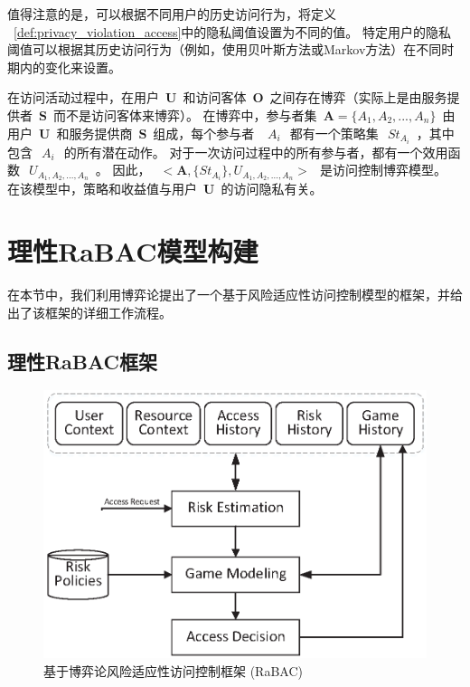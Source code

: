 值得注意的是，可以根据不同用户的历史访问行为，将定义 ~\ref{def:privacy_violation_access}中的隐私阈值设置为不同的值。 特定用户的隐私阈值可以根据其历史访问行为（例如，使用贝叶斯方法或Markov方法）在不同时期内的变化来设置。

在访问活动过程中，在用户~$\mathbf{U}$~和访问客体~$\mathbf{O}$~之间存在博弈（实际上是由服务提供者~$\mathbf{S}$~而不是访问客体来博弈）。 在博弈中，参与者集~$\mathbf{A}=\{A_1,A_2,...,A_n\}$~由用户~$\mathbf{U}$~和服务提供商~$\mathbf{S}$~组成，每个参与者 ~$~A_i~$~都有一个策略集~$~St_{A_i}$~，其中包含~$~A_i~$~的所有潜在动作。 对于一次访问过程中的所有参与者，都有一个效用函数~$~U_{A_1,A_2,...,A_n}$~。 因此，~$~<\mathbf{A},\{St_{A_i}\},U_{A_1,A_2,...,A_n}>~$~是访问控制博弈模型。 在该模型中，策略和收益值与用户~$\mathbf{U}$~的访问隐私有关。

\section{理性RaBAC模型构建}
\label{sec:framework}


在本节中，我们利用博弈论提出了一个基于风险适应性访问控制模型的框架，并给出了该框架的详细工作流程。
\subsection{理性RaBAC框架}
\label{sec:hlframework}

\begin{figure}[htb]
	\centering
	\includegraphics[width=.85\textwidth]{./figures/game-rbac-framework.eps}
	\caption{基于博弈论风险适应性访问控制框架 (RaBAC)}\label{fig:game-rbac-framework}
\end{figure}



